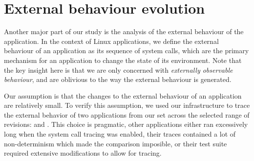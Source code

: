 \section{External behaviour evolution}
\label{evolution:external}


Another major part of our study is the analysis of the external behaviour of
the application. In the context of Linux applications, we define the external
behaviour of an application as its sequence of system calls, which are the
primary mechanism for an application to change the state of its environment.
Note that the key insight here is that we are only concerned with
\emph{externally observable behaviour}, and are oblivious to the way the
external behaviour is generated.

Our assumption is that the changes to the external behaviour of an application
are relatively small. To verify this assumption, we used our infrastructure to
trace the external behavior of two applications from our set across the
selected range of revisions: \lighttpd and \lighttpdtwo. This choice is
pragmatic, other applications either ran excessively long when the system call
tracing was enabled, their traces contained a lot of non-determinism which made
the comparison imposible, or their test suite required extensive modifications
to allow for tracing.


